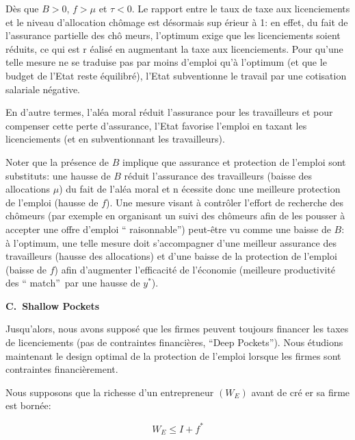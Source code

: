 \documentclass[a4paper]{article}
\begin{document}
D\`{e}s que $B>0$, $f>\mu $ et $\tau <0$. Le rapport entre le taux de taxe
aux licenciements et le niveau d'allocation ch\^{o}mage est d\'{e}sormais sup%
\'{e}rieur \`{a} 1: en effet, du fait de l'assurance partielle des ch\^{o}%
meurs, l'optimum exige que les licenciements soient r\'{e}duits, ce qui est r%
\'{e}alis\'{e} en augmentant la taxe aux licenciements. Pour qu'une telle
mesure ne se traduise pas par moins d'emploi qu'\`{a} l'optimum (et que le
budget de l'Etat reste \'{e}quilibr\'{e}), l'Etat subventionne le travail
par une cotisation salariale n\'{e}gative.

En d'autre termes, l'al\'{e}a moral r\'{e}duit l'assurance pour les
travailleurs et pour compenser cette perte d'assurance, l'Etat favorise
l'emploi en taxant les licenciements (et en subventionnant les travailleurs).

\bigskip

Noter que la pr\'{e}sence de $B$ implique que assurance et protection de
l'emploi sont substituts: une hausse de $B$ r\'{e}duit l'assurance des
travailleurs (baisse des allocations $\mu $) du fait de l'al\'{e}a moral et n%
\'{e}cessite donc une meilleure protection de l'emploi (hausse de $f$). Une
mesure visant \`{a} contr\^{o}ler l'effort de recherche des ch\^{o}meurs
(par exemple en organisant un suivi des ch\^{o}meurs afin de les pousser 
\`{a} accepter une offre d'emploi \textquotedblleft
raisonnable\textquotedblright ) peut-\^{e}tre vu comme une baisse de $B$: 
\`{a} l'optimum, une telle mesure doit s'accompagner d'une meilleur
assurance des travailleurs (hausse des allocations) et d'une baisse de la
protection de l'emploi (baisse de $f$) afin d'augmenter l'efficacit\'{e} de
l'\'{e}conomie (meilleure productivit\'{e} des \textquotedblleft
match\textquotedblright\ par une hausse de $y^{\ast }$).

\bigskip

\textbf{C.\ Shallow Pockets}

\bigskip

Jusqu'alors, nous avons suppos\'{e} que les firmes peuvent toujours financer
les taxes de licenciements (pas de contraintes financi\`{e}res,
\textquotedblleft Deep Pockets\textquotedblright ). Nous \'{e}tudions
maintenant le design optimal de la protection de l'emploi lorsque les firmes
sont contraintes financi\`{e}rement.

Nous supposons que la richesse d'un entrepreneur $(W_{E})$ avant de cr\'{e}%
er sa firme est born\'{e}e:

\begin{equation*}
W_{E}\leq I+f^{\ast }
\end{equation*}
\end{document}
